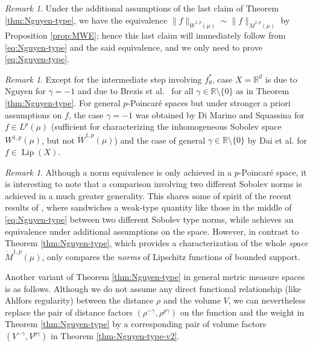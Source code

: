 \documentclass[11pt]{amsart}
\theoremstyle{definition}
\theoremstyle{remark}
\newtheorem{remark}[theorem]{Remark}
\numberwithin{equation}{section}
\newcommand{\Norm}[2]{\|#1\|_{#2}}
\begin{document}
\begin{remark}\label{rem:Nguyen-finish}
Under the additional assumptions of the last claim of Theorem \ref{thm:Nguyen-type}, we have
the equivalence $\Norm{f}{\dot W^{1,p}(\mu)}\sim\Norm{f}{\dot M^{1,p}(\mu)}$ by Proposition
\ref{prop:MWE}; hence this last claim will immediately follow from \eqref{eq:Nguyen-type}
and the said equivalence, and we only need to prove \eqref{eq:Nguyen-type}.
\end{remark}

\begin{remark}
Except for the intermediate step involving $f_\theta^*$, case $X=\mathbb R^d$ is due to
Nguyen \cite[Theorem 2]{N:06} for $\gamma=-1$ and due to Brezis et al.\ \cite[Theorem
1.3]{BSVY} for all $\gamma\in\mathbb R\setminus\{0\}$ as in Theorem \ref{thm:Nguyen-type}.
For general $p$-Poincar\'e spaces but under stronger a priori assumptions on $f$, the case
$\gamma=-1$ was obtained by Di Marino and Squassina \cite[Theorem 1.5]{DMS} for $f\in
L^p(\mu)$ (sufficient for characterizing the inhomogeneous Sobolev space $W^{1,p}(\mu)$, but
not $\dot W^{1,p}(\mu)$) and the case of general $\gamma\in\mathbb R\setminus\{0\}$ by Dai
et al. \cite[Corollary 1.14]{DLYYZ} for $f\in\operatorname{Lip}(X)$.
\end{remark}

\begin{remark}
Although a norm equivalence is only achieved in a $p$-Poincar\'e space,
it is interesting to note that a comparison involving two different Sobolev norms is
achieved
in a much greater generality. This shares some of spirit of the recent results of
\cite{HXZ},
where \cite[Theorem 1.3]{HXZ} sandwiches a weak-type quantity like those
in the middle of \eqref{eq:Nguyen-type} between two different Sobolev type norms,
while \cite[Corollary 1.5]{HXZ} achieves an equivalence under additional assumptions on the
space.
However, in contrast to Theorem \ref{thm:Nguyen-type},
which provides a characterization of the whole {\em space} $\dot M^{1,p}(\mu)$,
\cite{HXZ} only compares the {\em norms} of Lipschitz functions of bounded support.
\end{remark}

Another variant of Theorem \ref{thm:Nguyen-type} in general metric measure spaces is as
follows. Although we do not assume any direct functional relationship (like Ahlfors
regularity) between  the distance $\rho$ and the volume $V$, we can nevertheless replace the
pair of distance factors $(\rho^{-\gamma},\rho^{p\gamma})$ on the function and the weight in
Theorem \ref{thm:Nguyen-type} by a corresponding pair of volume factors
$(V^{-\gamma},V^{p\gamma})$ in Theorem \ref{thm-Nguyen-type-v2}.
\end{document}
